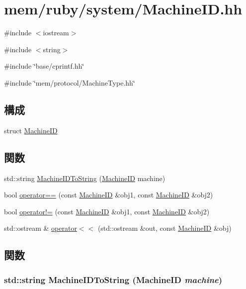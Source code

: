 \hypertarget{MachineID_8hh}{
\section{mem/ruby/system/MachineID.hh}
\label{MachineID_8hh}
}
{\ttfamily \#include $<$iostream$>$}\par
{\ttfamily \#include $<$string$>$}\par
{\ttfamily \#include \char`\"{}base/cprintf.hh\char`\"{}}\par
{\ttfamily \#include \char`\"{}mem/protocol/MachineType.hh\char`\"{}}\par
\subsection*{構成}
\begin{DoxyCompactItemize}
\item 
struct \hyperlink{structMachineID}{MachineID}
\end{DoxyCompactItemize}
\subsection*{関数}
\begin{DoxyCompactItemize}
\item 
std::string \hyperlink{MachineID_8hh_a29b44a36c3134dd9f0b41506e372d936}{MachineIDToString} (\hyperlink{structMachineID}{MachineID} machine)
\item 
bool \hyperlink{MachineID_8hh_afc2ad3307acf1a17f2c41b83b0bd0413}{operator==} (const \hyperlink{structMachineID}{MachineID} \&obj1, const \hyperlink{structMachineID}{MachineID} \&obj2)
\item 
bool \hyperlink{MachineID_8hh_a7342041807981c499dd80e1e1761428b}{operator!=} (const \hyperlink{structMachineID}{MachineID} \&obj1, const \hyperlink{structMachineID}{MachineID} \&obj2)
\item 
std::ostream \& \hyperlink{MachineID_8hh_a0f55f3e75651da1045254309a1ed6cad}{operator$<$$<$} (std::ostream \&out, const \hyperlink{structMachineID}{MachineID} \&obj)
\end{DoxyCompactItemize}


\subsection{関数}
\hypertarget{MachineID_8hh_a29b44a36c3134dd9f0b41506e372d936}{
\subsubsection[{MachineIDToString}]{\setlength{\rightskip}{0pt plus 5cm}std::string MachineIDToString ({\bf MachineID} {\em machine})}}
\label{MachineID_8hh_a29b44a36c3134dd9f0b41506e372d936}



